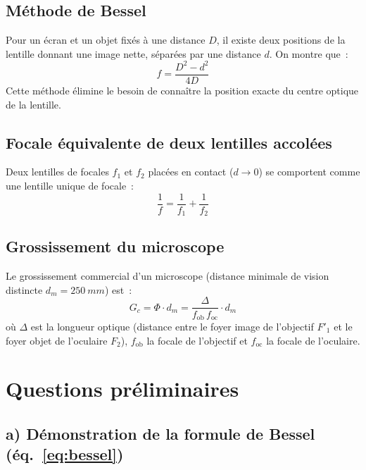 ﻿\documentclass[a4paper, 11pt]{article}
\begin{document}
\subsection{Méthode de Bessel}

Pour un écran et un objet fixés à une distance $D$, il existe deux positions de la lentille donnant une image nette, séparées par une distance $d$. On montre que~:
\begin{equation}
  f = \frac{D^2 - d^2}{4D}
  \label{eq:bessel}
\end{equation}
Cette méthode élimine le besoin de connaître la position exacte du centre optique de la lentille.

\subsection{Focale équivalente de deux lentilles accolées}

Deux lentilles de focales $f_1$ et $f_2$ placées en contact ($d \to 0$) se comportent comme une lentille unique de focale~:
\begin{equation}
  \frac{1}{f} = \frac{1}{f_1} + \frac{1}{f_2}
  \label{eq:lentilles_accolees}
\end{equation}

\subsection{Grossissement du microscope}

Le grossissement commercial d'un microscope (distance minimale de vision distincte $d_m = \SI{250}{mm}$) est~:
\begin{equation}
  G_c = \Phi \cdot d_m = \frac{\Delta}{f_\mathrm{ob}\,f_\mathrm{oc}} \cdot d_m
  \label{eq:grossissement}
\end{equation}
où $\Delta$ est la longueur optique (distance entre le foyer image de l'objectif $F'_1$ et le foyer objet de l'oculaire $F_2$), $f_\mathrm{ob}$ la focale de l'objectif et $f_\mathrm{oc}$ la focale de l'oculaire.

\section{Questions préliminaires}

\subsection*{a) Démonstration de la formule de Bessel (éq.~\ref{eq:bessel})}
\end{document}

